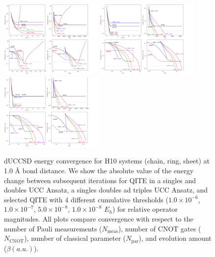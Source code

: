 \documentclass[aip,jcp,amsmath,amssymb, reprint]{revtex4-1}
\begin{document}
\begin{figure}[h!]
\centering
\includegraphics[width=0.45\textwidth]{sqite_paper/Chain 1.0 A.png}
\includegraphics[width=0.45\textwidth]{sqite_paper/Ring 1.0 A.png}
\includegraphics[width=0.45\textwidth]{sqite_paper/Sheet 1.0 A.png}
\caption{dUCCSD energy convergence for H10 systems (chain, ring, sheet) at 1.0 Å bond distance. We show the absolute value of the energy change between subsequent iterations for QITE in a singles and doubles UCC Ansatz, a singles doubles ad triples UCC Ansatz, and selected QITE with 4 different cumulative thresholds ($1.0 \times 10^{-6}$, $1.0 \times 10^{-7}$, $5.0 \times 10^{-8}$, $1.0 \times 10^{-8}$ $E_h$) for relative operator magnitudes. All plots compare convergence with respect to the number of Pauli measurements ($N_\mathrm{meas}$), number of CNOT gates ($N_\mathrm{CNOT}$), number of classical parameter ($N_\mathrm{par}$), and evolution amount ($\beta (a. u.)$).}
\label{fig:ene_plot_1.0A}
\end{figure}
\end{document}

